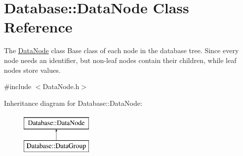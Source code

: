 \hypertarget{classDatabase_1_1DataNode}{}\section{Database\+:\+:Data\+Node Class Reference}
\label{classDatabase_1_1DataNode}


The \hyperlink{classDatabase_1_1DataNode}{Data\+Node} class Base class of each node in the database tree. Since every node needs an identifier, but non-\/leaf nodes contain their children, while leaf nodes store values.  




{\ttfamily \#include $<$Data\+Node.\+h$>$}

Inheritance diagram for Database\+:\+:Data\+Node\+:\begin{figure}[H]
\begin{center}
\leavevmode
\includegraphics[height=2.000000cm]{classDatabase_1_1DataNode}
\end{center}
\end{figure}
